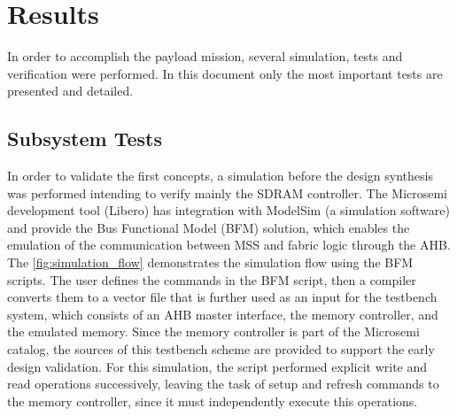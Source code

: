 %
%
%
%
%

%
%
%
%
%

\newpage

\section{Results} \label{sec:results}

In order to accomplish the payload mission, several simulation, tests and verification were performed. In this document only the most important tests are presented and detailed.


\subsection{Subsystem Tests}

In order to validate the first concepts, a simulation before the design synthesis was performed intending to verify mainly the SDRAM controller. The Microsemi development tool (Libero) has integration with ModelSim (a simulation software) and provide the Bus Functional Model (BFM) solution, which enables the emulation of the communication between MSS and fabric logic through the AHB. The \autoref{fig:simulation_flow} demonstrates the simulation flow using the BFM scripts. The user defines the commands in the BFM script, then a compiler converts them to a vector file that is further used as an input for the testbench system, which consists of an AHB master interface, the memory controller, and the emulated memory. Since the memory controller is part of the Microsemi catalog, the sources of this testbench scheme are provided to support the early design validation. For this simulation, the script performed explicit write and read operations successively, leaving the task of setup and refresh commands to the memory controller, since it must independently execute this operations.

